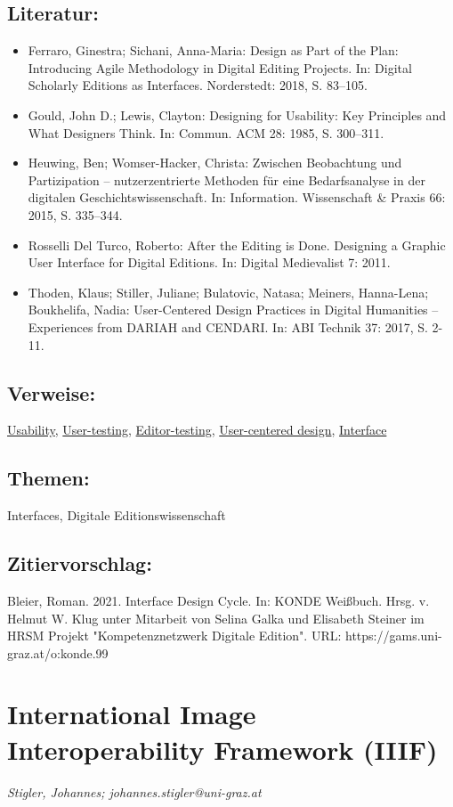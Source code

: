 \documentclass{article}
\begin{document}
        \subsection*{Literatur:}\begin{itemize}\item Ferraro, Ginestra; Sichani, Anna-Maria: Design as Part of the Plan: Introducing Agile
                              Methodology in Digital Editing Projects. In: Digital Scholarly Editions as Interfaces. Norderstedt: 2018, S. 83–105.\item Gould, John D.; Lewis, Clayton: Designing for Usability: Key Principles and What
                              Designers Think. In: Commun. ACM 28: 1985, S. 300–311.\item Heuwing, Ben; Womser-Hacker, Christa: Zwischen Beobachtung und Partizipation –
                              nutzerzentrierte Methoden für eine Bedarfsanalyse in der digitalen
                              Geschichtswissenschaft. In: Information. Wissenschaft & Praxis 66: 2015, S. 335–344.\item Rosselli Del Turco, Roberto: After the Editing is Done. Designing a Graphic User
                              Interface for Digital Editions. In: Digital Medievalist 7: 2011.\item Thoden, Klaus; Stiller, Juliane; Bulatovic, Natasa; Meiners, Hanna-Lena; Boukhelifa, Nadia: User-Centered Design Practices in Digital Humanities –
                              Experiences from DARIAH and CENDARI. In: ABI Technik 37: 2017, S. 2-11.\end{itemize}\subsection*{Verweise:}\href{https://gams.uni-graz.at/o:konde.205}{Usability}, \href{https://gams.uni-graz.at/o:konde.206}{User-testing}, \href{https://gams.uni-graz.at/o:konde.78}{Editor-testing}, \href{https://gams.uni-graz.at/o:konde.207}{User-centered design}, \href{https://gams.uni-graz.at/o:konde.98}{Interface}\subsection*{Themen:}Interfaces, Digitale Editionswissenschaft\subsection*{Zitiervorschlag:}Bleier, Roman. 2021. Interface Design Cycle. In: KONDE Weißbuch. Hrsg. v. Helmut W. Klug unter Mitarbeit von Selina Galka und Elisabeth Steiner im HRSM Projekt "Kompetenznetzwerk Digitale Edition". URL: https://gams.uni-graz.at/o:konde.99\newpage\section*{International Image Interoperability Framework (IIIF)} \emph{Stigler, Johannes; johannes.stigler@uni-graz.at}\\
        
\end{document}
